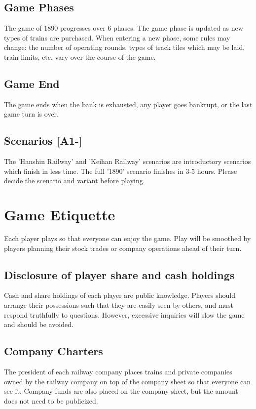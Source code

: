 \documentclass{article}
\begin{document}
\begin{CJK}{UTF8}{min}
\begin{multicols}{2}
\subsection{Game Phases}
The game of 1890 progresses over 6 phases. The game phase is updated
as new types of trains are purchased. When entering a new phase, some
rules may change: the number of operating rounds, types of track tiles
which may be laid, train limits, etc. vary over the course of the
game.


\subsection{Game End}
The game ends when the bank is exhausted, any player goes bankrupt,
or the last game turn is over.


\subsection{Scenarios [A1-]}
The 'Hanshin Railway' and 'Keihan Railway' scenarios are introductory
scenarios which finish in less time. The full '1890' scenario finishes
in 3-5 hours. Please decide the scenario and variant before playing.


\section{Game Etiquette}
Each player plays so that everyone can enjoy the game. Play will be
smoothed by players planning their stock trades or company operations
ahead of their turn.


\subsection{Disclosure of player share and cash holdings}
\label{player-cash}
Cash and share holdings of each player are public knowledge. Players
should arrange their possessions such that they are easily seen by
others, and must respond truthfully to questions. However, excessive
inquiries will slow the game and should be avoided.


\subsection{Company Charters}
\label{company-charters}
The president of each railway company places trains and private
companies owned by the railway company on top of the company sheet so
that everyone can see it. Company funds are also placed on the company
sheet, but the amount does not need to be publicized.



\end{multicols}
\end{CJK}
\end{document}
